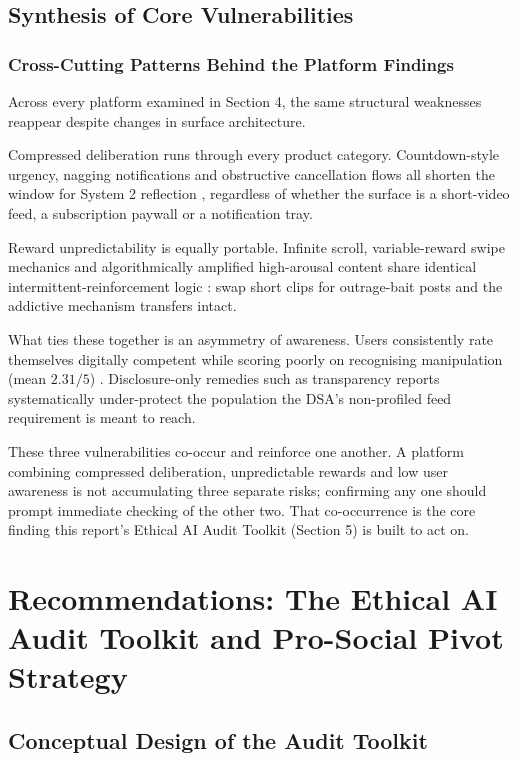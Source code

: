 \documentclass[11pt]{article}
\begin{document}
\subsection{Synthesis of Core Vulnerabilities}

\subsubsection{Cross-Cutting Patterns Behind the Platform Findings}
\label{sec:synthesis_core_vulnerabilities} Across every platform examined in Section 4, the same structural weaknesses reappear despite changes in surface architecture.

Compressed deliberation runs through every product category. Countdown-style urgency, nagging notifications and obstructive cancellation flows all shorten the window for System 2 reflection \parencites[8]{6295677}[138]{8745065}[7]{6295677}, regardless of whether the surface is a short-video feed, a subscription paywall or a notification tray.

Reward unpredictability is equally portable. Infinite scroll, variable-reward swipe mechanics and algorithmically amplified high-arousal content share identical intermittent-reinforcement logic \parencites[2]{8958037}[2]{3303310}: swap short clips for outrage-bait posts and the addictive mechanism transfers intact.

What ties these together is an asymmetry of awareness. Users consistently rate themselves digitally competent while scoring poorly on recognising manipulation (mean $2.31/5$) \parencites[31]{9360054}[7]{1456534}. Disclosure-only remedies such as transparency reports systematically under-protect the population the DSA's non-profiled feed requirement is meant to reach.

These three vulnerabilities co-occur and reinforce one another. A platform combining compressed deliberation, unpredictable rewards and low user awareness is not accumulating three separate risks; confirming any one should prompt immediate checking of the other two. That co-occurrence is the core finding this report's Ethical AI Audit Toolkit (Section 5) is built to act on.

\section{Recommendations: The Ethical AI Audit Toolkit and Pro-Social Pivot Strategy}

\subsection{Conceptual Design of the Audit Toolkit}
\end{document}
